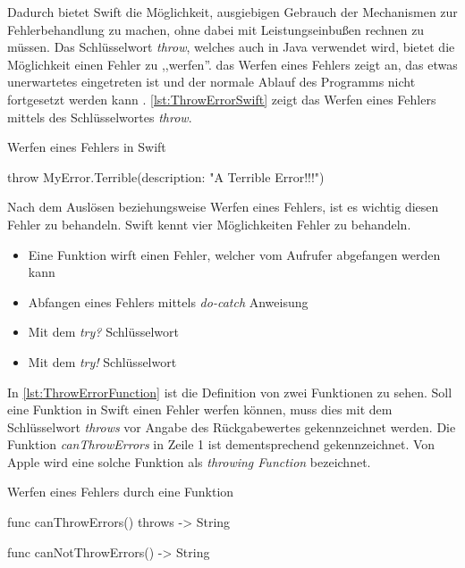 Dadurch bietet Swift die Möglichkeit, ausgiebigen Gebrauch der Mechanismen zur Fehlerbehandlung zu machen, ohne dabei mit Leistungseinbußen rechnen zu müssen.
Das Schlüsselwort \textit{throw}, welches auch in Java verwendet wird, bietet die Möglichkeit einen Fehler zu ,,werfen''.
das Werfen eines Fehlers zeigt an, das etwas unerwartetes eingetreten ist und der normale Ablauf des Programms nicht fortgesetzt werden kann \cite[S.311]{Apple.2017}.
\autoref{lst:ThrowErrorSwift} zeigt das Werfen eines Fehlers mittels des Schlüsselwortes \textit{throw}.

\begin{listing}
\caption{Werfen eines Fehlers in Swift}
\label{lst:ThrowErrorSwift}
\begin{SwiftCode}
throw MyError.Terrible(description: "A Terrible Error!!!")
\end{SwiftCode}
\end{listing}

Nach dem Auslösen beziehungsweise Werfen eines Fehlers, ist es wichtig diesen Fehler zu behandeln. 
Swift kennt vier Möglichkeiten Fehler zu behandeln.

\begin{itemize}
    \item Eine Funktion wirft einen Fehler, welcher vom Aufrufer abgefangen werden kann
    \item Abfangen eines Fehlers mittels \textit{do-catch} Anweisung
    \item Mit dem \textit{try?} Schlüsselwort
    \item Mit dem \textit{try!} Schlüsselwort
\end{itemize}

In \autoref{lst:ThrowErrorFunction} ist die Definition von zwei Funktionen zu sehen. 
Soll eine Funktion in Swift einen Fehler werfen können, muss dies mit dem Schlüsselwort \textit{throws} vor Angabe des Rückgabewertes gekennzeichnet werden.
Die Funktion \textit{canThrowErrors} in Zeile 1 ist dementsprechend gekennzeichnet.
Von Apple wird eine solche Funktion als \textit{throwing Function} bezeichnet. 

\begin{listing}
\caption{Werfen eines Fehlers durch eine Funktion \cite[S311]{Apple.2017}}
\label{lst:ThrowErrorFunction}
\begin{SwiftCode}
func canThrowErrors() throws -> String

func canNotThrowErrors() -> String
\end{SwiftCode}
\end{listing}

